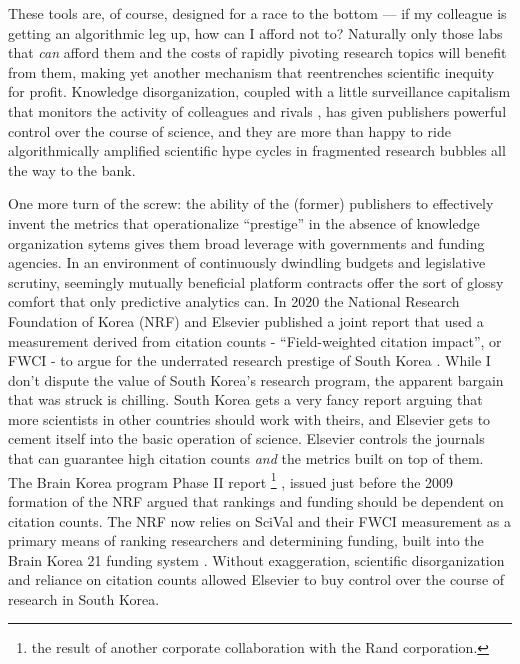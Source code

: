 These tools are, of course, designed for a race to the bottom --- if my
colleague is getting an algorithmic leg up, how can I afford not to?
Naturally only those labs that \emph{can} afford them and the costs of
rapidly pivoting research topics will benefit from them, making yet
another mechanism that reentrenches scientific inequity for profit.
Knowledge disorganization, coupled with a little surveillance capitalism
that monitors the activity of colleagues and rivals \citep{brembsReplacingAcademicJournals2021, hansonUserTrackingAcademic2019} ,
has given publishers powerful control over the course of science, and
they are more than happy to ride algorithmically amplified scientific
hype cycles in fragmented research bubbles all the way to the bank.

One more turn of the screw: the ability of the (former) publishers to
effectively invent the metrics that operationalize ``prestige'' in the
absence of knowledge organization sytems gives them broad leverage with
governments and funding agencies. In an environment of continuously
dwindling budgets and legislative scrutiny, seemingly mutually
beneficial platform contracts offer the sort of glossy comfort that only
predictive analytics can. In 2020 the National Research Foundation of
Korea (NRF) and Elsevier published a joint report that used a
measurement derived from citation counts - ``Field-weighted citation
impact'', or FWCI - to argue for the underrated research prestige of
South Korea \citep{researchfoundationofkoreaSouthKoreaTechnological2020} . While I don't
dispute the value of South Korea's research program, the apparent
bargain that was struck is chilling. South Korea gets a very fancy
report arguing that more scientists in other countries should work with
theirs, and Elsevier gets to cement itself into the basic operation of
science. Elsevier controls the journals that can guarantee high citation
counts \emph{and} the metrics built on top of them. The Brain Korea
program Phase II report \footnote{the result of another corporate
  collaboration with the Rand corporation.} \citep{seongBrainKorea212008} , issued just before the 2009 formation of the
NRF argued that rankings and funding should be dependent on citation
counts. The NRF now relies on SciVal and their FWCI measurement as a
primary means of ranking researchers and determining funding, built into
the Brain Korea 21 funding system \citep{elsevierCaseStudyNational2019, elsevierkoreaSciValHwalyongeulWihan2021} . Without exaggeration, scientific disorganization and reliance on
citation counts allowed Elsevier to buy control over the course of
research in South Korea.

